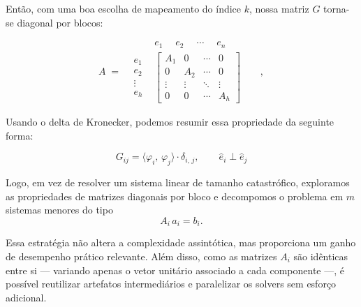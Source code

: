 Então, com uma boa escolha de mapeamento do índice $k$, nossa matriz $G$
torna-se diagonal por blocos:

$$
A \;=\;
\begin{array}{ccc}
  &

    e_1 \quad\;e_2 \quad\; \cdots \quad\; e_n

  & \\[1ex]
%
  \left. \,
    \begin{matrix}
      e_1\\
      e_2\\
      \vdots\\
      e_h
    \end{matrix}
  \right.
  &
    \begin{bmatrix}
      A_1      & 0        & \cdots & 0      \\
      0        & A_2      & \cdots & 0      \\
      \vdots   & \vdots   & \ddots & \vdots \\
      0        & 0        & \cdots & A_h
    \end{bmatrix}
  &
  \left.
    \begin{matrix}
      \\ \\ \\
    \end{matrix}
  \right.
\end{array},
$$

Usando o delta de Kronecker, podemos resumir essa propriedade da seguinte forma:

$$
    G_{ij} =
    \langle \varphi_i ,\, \varphi_j \rangle \cdot
    \delta_{i ,\, j}
    ,\quad\quad
    \hat e_i \perp \hat e_j
$$

Logo, em vez de resolver um sistema linear de tamanho catastrófico, exploramos
as propriedades de matrizes diagonais por bloco e decompomos o problema em $m$
sistemas menores do tipo
$$A_i \, a_i = b_i.$$

Essa estratégia não altera a complexidade assintótica, mas proporciona um ganho
de desempenho prático relevante.
Além disso, como as matrizes $A_i$ são idênticas entre si --- variando apenas o
vetor unitário associado a cada componente ---, é possível reutilizar
artefatos intermediários e paralelizar os solvers sem esforço adicional.

